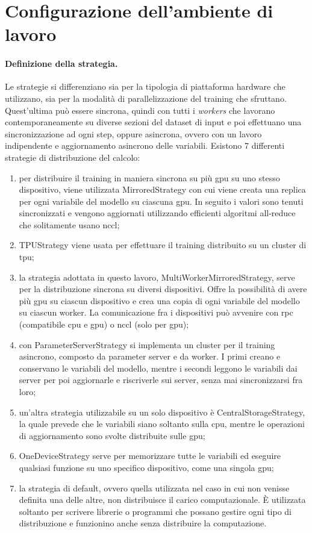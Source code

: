\documentclass[12pt,a4paper,fleqn,titlepage]{report}
\begin{document}
    \section{Configurazione dell'ambiente di lavoro}
        \paragraph{Definizione della strategia.}
        Le strategie si differenziano sia per la tipologia di piattaforma hardware che utilizzano, sia per la modalità di parallelizzazione del training che sfruttano. Quest'ultima può essere sincrona, quindi con tutti i \emph{workers} che lavorano contemporaneamente su diverse sezioni del dataset di input e poi effettuano una sincronizzazione ad ogni step, oppure asincrona, ovvero con un lavoro indipendente e aggiornamento asincrono delle variabili.
        Esistono 7 differenti strategie di distribuzione del calcolo:
        \begin{enumerate}
            \item per distribuire il training in maniera sincrona su più \gls{gpu} su uno stesso dispositivo, viene utilizzata MirroredStrategy con cui viene creata una replica per ogni variabile del modello su ciascuna \gls{gpu}. In seguito i valori sono tenuti sincronizzati e vengono aggiornati utilizzando efficienti \gls{algoritmi all-reduce} che solitamente usano \gls{nccl};
            \item TPUStrategy viene usata per effettuare il training distribuito su un \gls{cluster} di \gls{tpu};
            \item la strategia adottata in questo lavoro, MultiWorkerMirroredStrategy, serve per la distribuzione sincrona su diversi dispositivi. Offre la possibilità di avere più \gls{gpu} su ciascun dispositivo e crea una copia di ogni variabile del modello su ciascun worker. La comunicazione fra i dispositivi può avvenire con \gls{rpc} (compatibile \gls{cpu} e \gls{gpu}) o \gls{nccl} (solo per \gls{gpu});
            \item con ParameterServerStrategy si implementa un \gls{cluster} per il training asincrono, composto da parameter server e da worker. I primi creano e conservano le variabili del modello, mentre i secondi leggono le variabili dai server per poi aggiornarle e riscriverle sui server, senza mai sincronizzarsi fra loro;
            \item un'altra strategia utilizzabile su un solo dispositivo è CentralStorageStrategy, la quale prevede che le variabili siano soltanto sulla \gls{cpu}, mentre le operazioni di aggiornamento sono svolte distribuite sulle \gls{gpu};
            \item OneDeviceStrategy serve per memorizzare tutte le variabili ed eseguire qualsiasi funzione su uno specifico dispositivo, come una singola \gls{gpu};
            \item la strategia di default, ovvero quella utilizzata nel caso in cui non venisse definita una delle altre, non distribuisce il carico computazionale. È utilizzata soltanto per scrivere librerie o programmi che possano gestire ogni tipo di distribuzione e funzionino anche senza distribuire la computazione.
        \end{enumerate}
\end{document}
